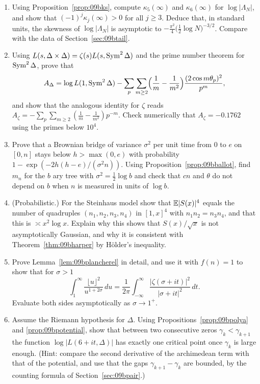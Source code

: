 \begin{enumerate}
\item\label{ex:09bcumulants} Using Proposition~\ref{prop:09bks}, compute $\kappa_5(\infty)$ and $\kappa_6(\infty)$ for $\log|\Lambda_N|$, and show that $(-1)^j\kappa_j(\infty)>0$ for all $j\ge3$. Deduce that, in standard units, the skewness of $\log|\Lambda_N|$ is asymptotic to $-\frac{\pi^2}4\bigl(\frac12\log N\bigr)^{-3/2}$. Compare with the data of Section~\ref{sec:09btail}.
\item\label{ex:09bmertens} Using $L(s,\Delta\times\Delta)=\zeta(s)L(s,\operatorname{Sym}^2\Delta)$ and the prime number theorem for $\operatorname{Sym}^2\Delta$, prove that
\[
A_\Delta=\log L(1,\operatorname{Sym}^2\Delta)-\sum_p\sum_{m\ge2}\Bigl(\frac1m-\frac1{m^2}\Bigr)\frac{(2\cos m\theta_p)^2}{p^m},
\]
and show that the analogous identity for $\zeta$ reads $A_\zeta=-\sum_p\sum_{m\ge2}(\frac1m-\frac1{m^2})p^{-m}$. Check numerically that $A_\zeta=-0.1762$ using the primes below $10^4$.
\item\label{ex:09bbridge} Prove that a Brownian bridge of variance $\sigma^2$ per unit time from $0$ to $e$ on $[0,n]$ stays below $h>\max(0,e)$ with probability $1-\exp(-2h(h-e)/(\sigma^2n))$. Using Proposition~\ref{prop:09bballot}, find $m_n$ for the $b$ ary tree with $\sigma^2=\frac12\log b$ and check that $cn$ and $\theta$ do not depend on $b$ when $n$ is measured in units of $\log b$.
\item\label{ex:09bfour} (Probabilistic.) For the Steinhaus model show that $\mathbb{E}|S(x)|^4$ equals the number of quadruples $(n_1,n_2,n_3,n_4)$ in $[1,x]^4$ with $n_1n_2=n_3n_4$, and that this is $\asymp x^2\log x$. Explain why this shows that $S(x)/\sqrt x$ is not asymptotically Gaussian, and why it is consistent with Theorem~\ref{thm:09bharper} by H\"older's inequality.
\item\label{ex:09bharper} Prove Lemma~\ref{lem:09bplancherel} in detail, and use it with $f(n)=1$ to show that for $\sigma>1$
\[
\int_1^\infty\frac{\lfloor u\rfloor^2}{u^{1+2\sigma}}\,du=\frac1{2\pi}\int_{-\infty}^\infty\frac{|\zeta(\sigma+it)|^2}{|\sigma+it|^2}\,dt .
\] Evaluate both sides asymptotically as $\sigma\to1^+$.
\item\label{ex:09bconcave} Assume the Riemann hypothesis for $\Delta$. Using Propositions~\ref{prop:09bpolya} and \ref{prop:09bpotential}, show that between two consecutive zeros $\gamma_k<\gamma_{k+1}$ the function $\log|L(6+it,\Delta)|$ has exactly one critical point once $\gamma_k$ is large enough. (Hint: compare the second derivative of the archimedean term with that of the potential, and use that the gaps $\gamma_{k+1}-\gamma_k$ are bounded, by the counting formula of Section~\ref{sec:09bpair}.)
\end{enumerate}

